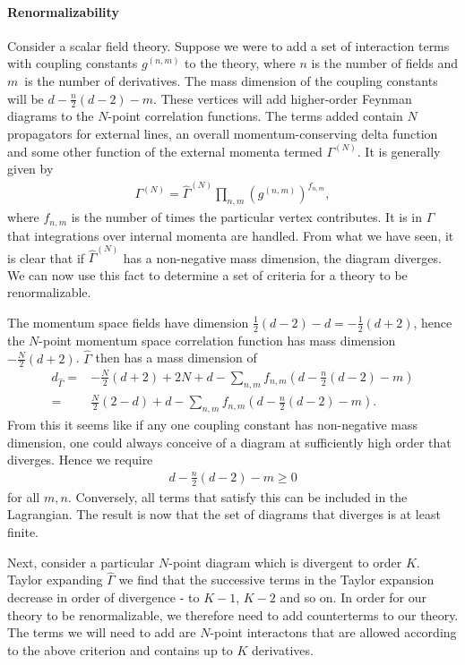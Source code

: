 \paragraph{Renormalizability}
Consider a scalar field theory. Suppose we were to add a set of interaction terms with coupling constants $g^{(n, m)}$ to the theory, where $n$ is the number of fields and $m$ is the number of derivatives. The mass dimension of the coupling constants will be $d - \frac{n}{2}(d - 2) - m$. These vertices will add higher-order Feynman diagrams to the $N$-point correlation functions. The terms added contain $N$ propagators for external lines, an overall momentum-conserving delta function and some other function of the external momenta termed $\Gamma^{(N)}$. It is generally given by
\begin{align*}
	\Gamma^{(N)} = \hat{\Gamma}^{(N)}\prod\limits_{n, m}(g^{(n, m)})^{f_{n, m}},
\end{align*}
where $f_{n, m}$ is the number of times the particular vertex contributes. It is in $\hat{\Gamma}$ that integrations over internal momenta are handled. From what we have seen, it is clear that if $\hat{\Gamma}^{(N)}$ has a non-negative mass dimension, the diagram diverges. We can now use this fact to determine a set of criteria for a theory to be renormalizable. 

The momentum space fields have dimension $\frac{1}{2}(d - 2) - d = -\frac{1}{2}(d + 2)$, hence the $N$-point momentum space correlation function has mass dimension $-\frac{N}{2}(d + 2)$. $\hat{\Gamma}$ then has a mass dimension of
\begin{align*}
	d_{\hat{\Gamma}} =& -\frac{N}{2}(d + 2) + 2N + d - \sum\limits_{n, m}f_{n, m}\left(d - \frac{n}{2}(d - 2) - m\right) \\
	                 =& \frac{N}{2}(2 - d) + d - \sum\limits_{n, m}f_{n, m}\left(d - \frac{n}{2}(d - 2) - m\right).
\end{align*}
From this it seems like if any one coupling constant has non-negative mass dimension, one could always conceive of a diagram at sufficiently high order that diverges. Hence we require
\begin{align*}
	d - \frac{n}{2}(d - 2) - m \geq 0
\end{align*}
for all $m, n$. Conversely, all terms that satisfy this can be included in the Lagrangian. The result is now that the set of diagrams that diverges is at least finite.

Next, consider a particular $N$-point diagram which is divergent to order $K$. Taylor expanding $\hat{\Gamma}$ we find that the successive terms in the Taylor expansion decrease in order of divergence - to $K - 1$, $K - 2$ and so on. In order for our theory to be renormalizable, we therefore need to add counterterms to our theory. The terms we will need to add are $N$-point interactons that are allowed according to the above criterion and contains up to $K$ derivatives.

